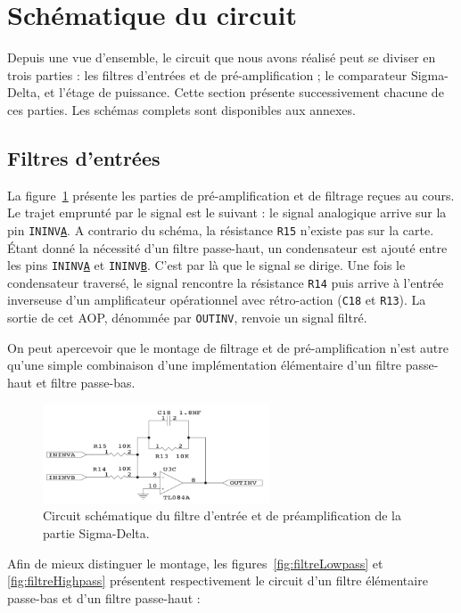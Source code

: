 \documentclass[10pt, oneside, a4paper]{article}
\begin{document}
\section{Schématique du circuit}
Depuis une vue d'ensemble, le circuit que nous avons réalisé peut se diviser en trois parties : les filtres d'entrées et de pré-amplification ; le comparateur Sigma-Delta, et l'étage de puissance.
Cette section présente successivement chacune de ces parties.
Les schémas complets sont disponibles aux annexes.

\subsection{Filtres d'entrées}
\label{sec:filtresEntrees}
La figure~\ref{fig:schemaPreAmpli} présente les parties de pré-amplification et de filtrage reçues au cours.
Le trajet emprunté par le signal est le suivant : le signal analogique arrive sur la pin \texttt{ININV\underline{A}}.
A contrario du schéma, la résistance \texttt{R15} n'existe pas sur la carte.
Étant donné la nécessité d'un filtre passe-haut, un condensateur est ajouté entre les pins \texttt{ININV\underline{A}} et \texttt{ININV\underline{B}}.
C'est par là que le signal se dirige.
Une fois le condensateur traversé, le signal rencontre la résistance \texttt{R14} puis arrive à l'entrée inverseuse d'un amplificateur opérationnel avec rétro-action (\texttt{C18} et \texttt{R13}).
La sortie de cet AOP, dénommée par \texttt{OUTINV}, renvoie un signal filtré.

On peut apercevoir que le montage de filtrage et de pré-amplification n'est autre qu'une simple combinaison d'une implémentation élémentaire d'un filtre passe-haut et filtre passe-bas.
\begin{figure}[!ht]
    \centering
    \includegraphics[width=0.6\textwidth]{image/schematique-all.jpg}
    \caption{Circuit schématique du filtre d'entrée et de préamplification de la partie
             Sigma-Delta.}
    \label{fig:schemaPreAmpli}
\end{figure}

Afin de mieux distinguer le montage, les figures~\ref{fig:filtreLowpass} et \ref{fig:filtreHighpass} présentent respectivement le circuit d'un filtre élémentaire passe-bas et d'un filtre passe-haut :
\end{document}
